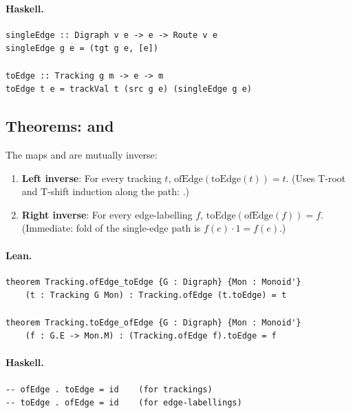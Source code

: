 \documentclass[11pt,a4paper]{article}
\begin{document}
\paragraph{Haskell.}
\begin{lstlisting}[style=haskell]
singleEdge :: Digraph v e -> e -> Route v e
singleEdge g e = (tgt g e, [e])

toEdge :: Tracking g m -> e -> m
toEdge t e = trackVal t (src g e) (singleEdge g e)
\end{lstlisting}


\subsection{Theorems:  and }

\begin{thm}
The maps  and  are mutually inverse:
\begin{enumerate}
  \item \textbf{Left inverse}: For every tracking $t$,
    $\mathrm{ofEdge}(\mathrm{toEdge}(t)) = t$.  (Uses T-root and T-shift
    induction along the path: .)
  \item \textbf{Right inverse}: For every edge-labelling $f$,
    $\mathrm{toEdge}(\mathrm{ofEdge}(f)) = f$.  (Immediate: fold of the
    single-edge path is $f(e) \cdot 1 = f(e)$.)
\end{enumerate}
\end{thm}

\paragraph{Lean.}
\begin{lstlisting}[style=lean]
theorem Tracking.ofEdge_toEdge {G : Digraph} {Mon : Monoid'}
    (t : Tracking G Mon) : Tracking.ofEdge (t.toEdge) = t

theorem Tracking.toEdge_ofEdge {G : Digraph} {Mon : Monoid'}
    (f : G.E -> Mon.M) : (Tracking.ofEdge f).toEdge = f
\end{lstlisting}

\paragraph{Haskell.}
\begin{lstlisting}[style=haskell]
-- ofEdge . toEdge = id    (for trackings)
-- toEdge . ofEdge = id    (for edge-labellings)
\end{lstlisting}
\end{document}
